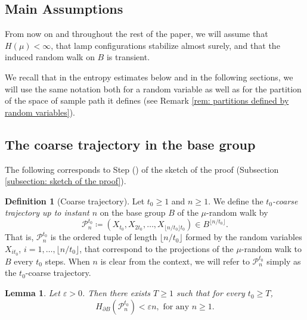\documentclass[reqno,oneside,11pt]{amsart}
\theoremstyle{plain}
\newtheorem{lem}[thm]{Lemma}
\theoremstyle{definition}
\newtheorem{defn}[thm]{Definition} %
\begin{document}
\subsection{Main Assumptions}\label{subsection: main assumptions} From now on and throughout the rest of the paper, we will assume that $H(\mu)<\infty$, that lamp configurations stabilize almost surely, and that the induced random walk on $B$ is transient.

We recall that in the entropy estimates below and in the following sections, we will use the same notation both for a random variable as well as for the partition of the space of sample path it defines (see Remark \ref{rem: partitions defined by random variables}).
\subsection{The coarse trajectory in the base group}
The following corresponds to Step () of the sketch of the proof (Subsection \ref{subsection: sketch of the proof}).

\begin{defn}[Coarse trajectory]\label{def: coarse trajectory in base group}  Let $t_0\ge 1$ and $n\ge 1$. We define the \emph{$t_0$-coarse trajectory up to instant $n$} on the base group $B$ of the $\mu$-random walk by
	\begin{equation*}
		\mathcal{P}_n^{t_0}\coloneqq \left(X_{t_0}, X_{2t_0},\ldots, X_{\lfloor n/t_0\rfloor t_0 }\right)\in B^{\lfloor n/t_0\rfloor}.
	\end{equation*}
	That is, $\mathcal{P}_n^{t_0}$ is the ordered tuple of length $\lfloor n/t_0\rfloor$ formed by the random variables $X_{it_0}$, $i=1,\ldots, \lfloor n/t_0\rfloor$, that correspond to the projections of the $\mu$-random walk to $B$ every $t_0$ steps. When $n$ is clear from the context, we will refer to $\mathcal{P}_n^{t_0}$ simply as the $t_0$-coarse trajectory.
\end{defn}


\begin{lem}\label{lem: coarse traj has small entropy} Let $\varepsilon>0$. Then there exists $T\ge1$ such that for every $t_0\ge T$,
	\begin{equation*}\label{eq: coarse trajectory entropy}
		H_{\partial B}(\mathcal{P}_n^{t_0} )<\varepsilon n, \text{ for any }n\ge 1.
	\end{equation*}
\end{lem}
\end{document}
